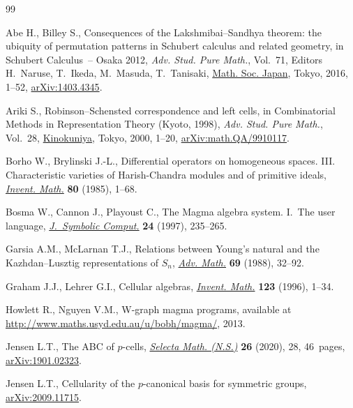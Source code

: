 \documentclass[pdftex]{sigma}
\numberwithin{equation}{section}
\begin{document}
\begin{thebibliography}{99}
\footnotesize\itemsep=0pt

Abe H., Billey S., Consequences of the {L}akshmibai--{S}andhya theorem: the
 ubiquity of permutation patterns in {S}chubert calculus and related geometry,
 in Schubert Calculus~-- {O}saka 2012, \textit{Adv. Stud. Pure Math.},
 Vol.~71, Editors H.~Naruse, T.~Ikeda, M.~Masuda, T.~Tanisaki, \href{https://doi.org/10.2969/aspm/07110001}{Math. Soc.
 Japan}, Tokyo, 2016, 1--52, \href{https://arxiv.org/abs/1403.4345}{arXiv:1403.4345}.

Ariki S., Robinson--{S}chensted correspondence and left cells, in Combinatorial
 Methods in Representation Theory ({K}yoto, 1998), \textit{Adv. Stud. Pure
 Math.}, Vol.~28, \href{https://doi.org/10.2969/aspm/02810001}{Kinokuniya}, Tokyo, 2000, 1--20, \href{https://arxiv.org/abs/math.QA/9910117}{arXiv:math.QA/9910117}.

Borho W., Brylinski J.-L., Differential operators on homogeneous spaces. {III}.
 {C}haracteristic varieties of {H}arish-{C}handra modules and of primitive
 ideals, \href{https://doi.org/10.1007/BF01388547}{\textit{Invent. Math.}} \textbf{80} (1985), 1--68.

Bosma W., Cannon J., Playoust C., The {M}agma algebra system. {I}.~{T}he user
 language, \href{https://doi.org/10.1006/jsco.1996.0125}{\textit{J.~Symbolic Comput.}} \textbf{24} (1997), 235--265.

Garsia A.M., McLarnan T.J., Relations between {Y}oung's natural and the
 {K}azhdan--{L}usztig representations of {$S_n$}, \href{https://doi.org/10.1016/0001-8708(88)90060-6}{\textit{Adv. Math.}}
 \textbf{69} (1988), 32--92.

Graham J.J., Lehrer G.I., Cellular algebras, \href{https://doi.org/10.1007/BF01232365}{\textit{Invent. Math.}}
 \textbf{123} (1996), 1--34.

Howlett R., Nguyen V.M., W-graph magma programs, {a}vailable at
 \url{http://www.maths.usyd.edu.au/u/bobh/magma/}, 2013.

Jensen L.T., The {ABC} of {$p$}-cells, \href{https://doi.org/10.1007/s00029-020-0552-1}{\textit{Selecta Math. (N.S.)}}
 \textbf{26} (2020), 28, 46~pages, \href{https://arxiv.org/abs/1901.02323}{arXiv:1901.02323}.

Jensen L.T., Cellularity of the $p$-canonical basis for symmetric groups,
 \href{https://arxiv.org/abs/2009.11715}{arXiv:2009.11715}.


\end{thebibliography}
\end{document}
